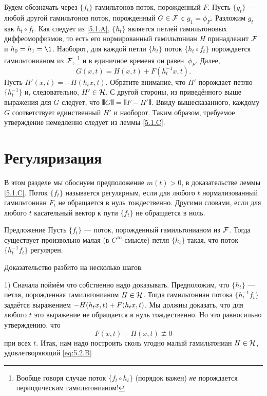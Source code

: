 Будем обозначать через $\{f_t\}$ гамильтонов поток, порожденный $F$.
Пусть $\{g_t\}$ --- любой другой гамильтонов поток, порожденный $G \in \mathcal{F}$ с $g_1 = \phi_F$.
Разложим $g_t$ как $h_t \circ f_t$.
Как следует из \ref{5.1.A}, $\{h_t\}$ является петлей гамильтоновых диффеоморфизмов, то есть его нормированный гамильтониан $H$ принадлежит $\mathcal{F}$ и $h_0 = h_1 = \1$.
Наоборот, для каждой петли $\{h_t\}$ поток $\{h_t \circ f_t\}$ порождается гамильтонианом из $\mathcal{F}$,%
\footnote{Вообще говоря случае поток $\{f_t \circ h_t\}$ (порядок важен) \emph{не} порождается периодическим гамильтонианом!}
и в единичное временя он равен~$\phi_F$.
Далее, 
\[G (x, t) = H (x, t) + F (h^{-1}_t x, t).\]
Пусть $H' (x, t) = -H (h_t x, t)$.
Обратите внимание, что $H'$ порождает петлю $\{h^{-1}_t\}$ и, следовательно, $H'\in\mathcal{H}$.
С другой стороны, из приведённого выше выражения для $G$ следует, что $\VERT G \VERT = \VERT F - H' \VERT$.
Ввиду вышесказанного, каждому $G$ соответствует единственный $H'$ и наоборот.
Таким образом, требуемое утверждение немедленно следует из леммы \ref{5.1.C}.

\section{Регуляризация}\label{5.2}

В этом разделе мы обоснуем предположение $m(t)>0$, в доказательстве леммы \ref{5.1.C}.
Поток $\{f_t\}$ называется регулярным, если для любого $t$ нормализованный гамильтониан $F_t$ не обращается в нуль тождественно.
Другими словами, если для любого $t$ касательный вектор к пути $\{f_t\}$ не обращается в ноль.

\begin{thm}{Предложение}\label{5.2.A}
Пусть $\{f_t\}$ --- поток, порожденный гамильтонианом из $\mathcal{F}$.
Тогда существует произвольно малая (в $C^\infty$-смысле) петля $\{h_t\}$ такая, что поток $\{h^{-1}_t f_t\}$ регулярен.
\end{thm}

Доказательство разбито на несколько шагов.

1) Сначала поймём что собственно надо доказывать.
Предположим, что $\{h_t\}$ --- петля, порожденная гамильтонианом $H \in \mathcal{H}$.
Тогда гамильтониан потока $\{h^{-1}_t f_t\}$ задаётся выражением $-H (h_t x, t) \z+ F (h_t x, t)$.
Мы должны доказать, что для любого $t$ это выражение не обращается в нуль тождественно.
Но это равносильно утверждению, что 
\begin{equation}
F (x, t) - H (x, t) \not\equiv 0\label{eq:5.2.B}
\end{equation}
при всех $t$.
Итак, нам надо построить сколь угодно малый гамильтониан $H \in \mathcal{H}$, удовлетворяющий \ref{eq:5.2.B}

